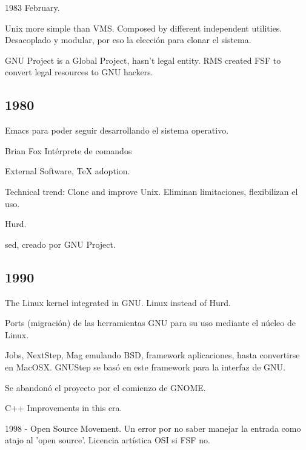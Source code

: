 \documentclass[11pt]{scrartcl}
\begin{document}
1983 February.

\par Unix more simple than VMS. Composed by different independent utilities. Desacoplado y modular, por eso la elecci\'on para clonar el sistema.

\par GNU Project is a Global Project, hasn't legal entity. RMS created FSF to convert legal resources to GNU hackers.

\subsection{1980}
\label{sub:1980}

\par Emacs para poder seguir desarrollando el sistema operativo.

\par Brian Fox Int\'erprete de comandos

\par External Software, \TeX{} adoption.

\par Technical trend: Clone and improve Unix. Eliminan limitaciones, flexibilizan el uso.

\par Hurd.

\par sed, creado por GNU Project.


\subsection{1990}
\label{sub:1990}

\par The Linux kernel integrated in GNU. Linux instead of Hurd.

\par Ports (migraci\'on) de las herramientas GNU para su uso mediante el n\'ucleo de Linux.

\par Jobs, NextStep, Mag emulando BSD, framework aplicaciones, hasta convertirse en MacOSX. GNUStep se bas\'o en este framework para la interfaz de GNU.

\par Se abandon\'o el proyecto por el comienzo de GNOME.

\par C++ Improvements in this era.

\par 1998 - Open Source Movement. Un error por no saber manejar la entrada como atajo al 'open source'. Licencia art\'istica OSI si FSF no.
\end{document}
